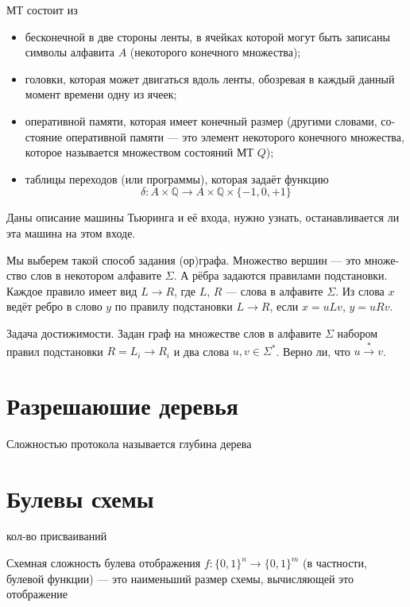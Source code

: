 \documentclass{article}
\newcommand{\Q}{\mathbb{Q}}
\newenvironment{definition}[2][Определение]{\begin{trivlist}
\item[\hskip \labelsep {\bfseries #1}\hskip \labelsep {\bfseries #2}]}{\end{trivlist}}
\begin{document}
\begin{definition}{МТ}
МТ состоит из
\begin{itemize}
\item бесконечной в две стороны ленты, в ячейках которой могут быть записаны
символы алфавита $A$ (некоторого конечного множества);
\item головки, которая может двигаться вдоль ленты, обозревая в каждый данный
момент времени одну из ячеек;
\item оперативной памяти, которая имеет конечный размер (другими словами, со-
стояние оперативной памяти — это элемент некоторого конечного множества,
которое называется множеством состояний МТ $Q$);
\item таблицы переходов (или программы), которая задаёт функцию
\[
\delta : A \times \Q \to A \times \Q \times \{-1, 0, +1\}
\]
\end{itemize}
\end{definition}

\begin{definition}{Проблема остановки}
Даны описание машины Тьюринга и её входа,
нужно узнать, останавливается ли эта машина на этом входе.
\end{definition}

\begin{definition}{Граф подстановок.}
Мы выберем такой способ задания (ор)графа. Множество вершин — это множе-
ство слов в некотором алфавите $\Sigma$. А рёбра задаются правилами подстановки. Каждое правило имеет вид
$L \to R$,
где $L$, $R$ --- слова в алфавите $\Sigma$. Из слова $x$ ведёт ребро в слово $y$ по правилу подстановки $L \to R$, если $x = uLv$, $y = uRv$.
\end{definition}

\begin{definition}{Проблема остановки.}
Задача достижимости. Задан граф на множестве слов в алфавите $\Sigma$ набором
правил подстановки $R = {L_i \to R_i}$ и два слова $u, v \in \Sigma^{*}$. 
Верно ли, что $u \stackrel{*}{\to} v$.
\end{definition}

\section{Разрешаюшие деревья}
\begin{definition}{Сложность}
Сложностью протокола называется глубина дерева 
\end{definition}

\section{Булевы схемы}
\begin{definition}{Размер}
кол-во присваиваний
\end{definition}
\begin{definition}{Схемная cложность}
Схемная сложность булева отображения $f : {\{0, 1\}}^n \to {\{0, 1\}}^m$
(в частности, булевой функции) --- это наименьший размер схемы, вычисляющей это
отображение
\end{definition}
\end{document}
